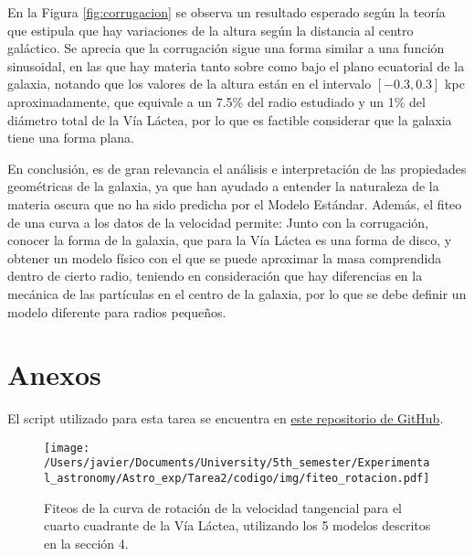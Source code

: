 \documentclass[letterpaper,oneside]{article}
\begin{document}
En la Figura \ref{fig:corrugacion} se observa un resultado esperado según la teoría que estipula que hay variaciones de la altura según la distancia al centro galáctico. Se aprecia que la corrugación sigue una forma similar a una función sinusoidal, en las que hay materia tanto sobre como bajo el plano ecuatorial de la galaxia, notando que los valores de la altura están en el intervalo $[-0.3,0.3]$ kpc aproximadamente, que equivale a un 7.5\% del radio estudiado y un 1\% del diámetro total de la Vía Láctea, por lo que es factible considerar que la galaxia tiene una forma plana.

En conclusión, es de gran relevancia el análisis e interpretación de las propiedades geométricas de la galaxia, ya que han ayudado a entender la naturaleza de la materia oscura que no ha sido predicha por el Modelo Estándar. Además, el fiteo de una curva a los datos de la velocidad permite: Junto con la corrugación, conocer la forma de la galaxia, que para la Vía Láctea es una forma de disco, y obtener un modelo físico con el que se puede aproximar la masa comprendida dentro de cierto radio, teniendo en consideración que hay diferencias en la mecánica de las partículas en el centro de la galaxia, por lo que se debe definir un modelo diferente para radios pequeños.

\newpage
\section{Anexos}
El script utilizado para esta tarea se encuentra en \href{https://github.com/Wenupi/Astro_exp}{este repositorio de GitHub}.







\begin{figure}[H]
    \centering
    \texttt{[image: /Users/javier/Documents/University/5th\_semester/Experimental\_astronomy/Astro\_exp/Tarea2/codigo/img/fiteo\_rotacion.pdf]}
    \caption{Fiteos de la curva de rotación de la velocidad tangencial para el cuarto cuadrante de la Vía Láctea, utilizando los 5 modelos descritos en la sección 4.}
    \label{fig:fit-curva-rotacion}
\end{figure}



\end{document}
